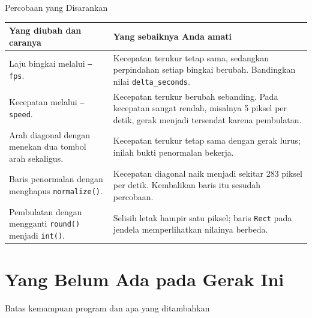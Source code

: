 \documentclass[aspectratio=169,10pt]{beamer}
\begin{document}
\begin{frame}{Percobaan yang Disarankan}
{\scriptsize
\renewcommand{\arraystretch}{1.08}
\begin{tabularx}{\textwidth}{@{}>{\raggedright\arraybackslash}p{5.4cm} X@{}}
\toprule
\textbf{Yang diubah dan caranya} & \textbf{Yang sebaiknya Anda amati} \\
\midrule
Laju bingkai melalui \texttt{--fps}. &
  Kecepatan terukur tetap sama, sedangkan perpindahan setiap bingkai berubah.
  Bandingkan nilai \texttt{delta\_seconds}. \\
Kecepatan melalui \texttt{--speed}. &
  Kecepatan terukur berubah sebanding. Pada kecepatan sangat rendah, misalnya
  5 piksel per detik, gerak menjadi tersendat karena pembulatan. \\
Arah diagonal dengan menekan dua tombol arah sekaligus. &
  Kecepatan terukur tetap sama dengan gerak lurus; inilah bukti penormalan
  bekerja. \\
Baris penormalan dengan menghapus \texttt{normalize()}. &
  Kecepatan diagonal naik menjadi sekitar 283 piksel per detik. Kembalikan baris
  itu sesudah percobaan. \\
Pembulatan dengan mengganti \texttt{round()} menjadi \texttt{int()}. &
  Selisih letak hampir satu piksel; baris \texttt{Rect} pada jendela
  memperlihatkan nilainya berbeda. \\
\bottomrule
\end{tabularx}}
\vspace{0.12cm}
\end{frame}

\section{Yang Belum Ada pada Gerak Ini}
  {Batas kemampuan program dan apa yang ditambahkan}
\end{document}
